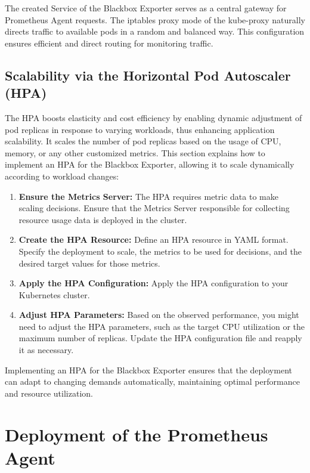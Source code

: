 The created Service of the Blackbox Exporter serves as a central gateway for Prometheus Agent requests. The iptables proxy mode of the kube-proxy naturally directs traffic to available pods in a random and balanced way. This configuration ensures efficient and direct routing for monitoring traffic. 

\subsection{Scalability via the Horizontal Pod Autoscaler (\ac{HPA})}

The \ac{HPA} boosts elasticity and cost efficiency by enabling dynamic adjustment of pod replicas in response to varying workloads, thus enhancing application scalability. It scales the number of pod replicas based on the usage of CPU, memory, or any other customized metrics\parencite{redhatCustomMetricsAutoscaler}. This section explains how to implement an \ac{HPA} for the Blackbox Exporter, allowing it to scale dynamically according to workload changes: 

\begin{enumerate}
    \item \textbf{Ensure the Metrics Server:}
    The \ac{HPA} requires metric data to make scaling decisions. Ensure that the Metrics Server responsible for collecting resource usage data is deployed in the cluster. 
    \item \textbf{Create the \ac{HPA} Resource:}
    Define an \ac{HPA} resource in YAML format. Specify the deployment to scale, the metrics to be used for decisions, and the desired target values for those metrics. 
    \item \textbf{Apply the \ac{HPA} Configuration:}
    Apply the \ac{HPA} configuration to your Kubernetes cluster. 
    \item \textbf{Adjust \ac{HPA} Parameters:}
    Based on the observed performance, you might need to adjust the \ac{HPA} parameters, such as the target \ac{CPU} utilization or the maximum number of replicas. Update the \ac{HPA} configuration file and reapply it as necessary.
\end{enumerate}

Implementing an \ac{HPA} for the Blackbox Exporter ensures that the deployment can adapt to changing demands automatically, maintaining optimal performance and resource utilization.

\section{Deployment of the Prometheus Agent}

